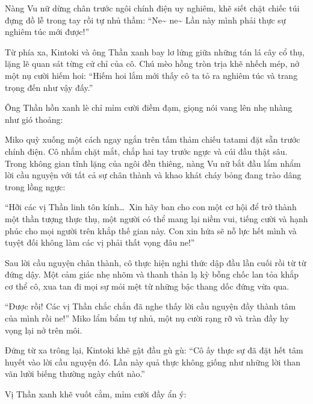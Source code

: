 \documentclass[../main.tex]{subfiles}
\begin{document}

Nàng Vu nữ dừng chân trước ngôi chính điện uy nghiêm, khẽ siết chặt chiếc túi đựng đồ lễ trong tay rồi tự nhủ thầm: ``Ne\~{} ne\~{} Lần này mình phải thực sự nghiêm túc mới được!''

Từ phía xa, Kintoki và ông Thần xanh bay lơ lửng giữa những tán lá cây cổ thụ, lặng lẽ quan sát từng cử chỉ của cô. Chú mèo hồng tròn trịa khẽ nhếch mép, nở một nụ cười hiếm hoi: ``Hiếm hoi lắm mới thấy cô ta tỏ ra nghiêm túc và trang trọng đến như vậy đấy.''

Ông Thần hồn xanh lè chỉ mỉm cười điềm đạm, giọng nói vang lên nhẹ nhàng như gió thoảng: 

Miko quỳ xuống một cách ngay ngắn trên tấm thảm chiếu tatami đặt sẵn trước chính điện. Cô nhắm chặt mắt, chắp hai tay trước ngực và cúi đầu thật sâu. Trong không gian tĩnh lặng của ngôi đền thiêng, nàng Vu nữ bắt đầu lẩm nhẩm lời cầu nguyện với tất cả sự chân thành và khao khát cháy bỏng đang trào dâng trong lồng ngực:

\begin{center}
  ``Hỡi các vị Thần linh tôn kính\dots\ Xin hãy ban cho con một cơ hội để trở thành một thần tượng thực thụ, một người có thể mang lại niềm vui, tiếng cười và hạnh phúc cho mọi người trên khắp thế gian này. Con xin hứa sẽ nỗ lực hết mình và tuyệt đối không làm các vị phải thất vọng đâu ne!''
\end{center}


Sau lời cầu nguyện chân thành, cô thực hiện nghi thức dập đầu lần cuối rồi từ từ đứng dậy. Một cảm giác nhẹ nhõm và thanh thản lạ kỳ bỗng chốc lan tỏa khắp cơ thể cô, xua tan đi mọi sự mỏi mệt từ những bậc thang dốc đứng vừa qua.

``Được rồi! Các vị Thần chắc chắn đã nghe thấy lời cầu nguyện đầy thành tâm của mình rồi ne!'' Miko lẩm bẩm tự nhủ, một nụ cười rạng rỡ và tràn đầy hy vọng lại nở trên môi.

Đứng từ xa trông lại, Kintoki khẽ gật đầu gù gù: ``Cô ấy thực sự đã đặt hết tâm huyết vào lời cầu nguyện đó. Lần này quả thực không giống như những lời than vãn lười biếng thường ngày chút nào.''

Vị Thần xanh khẽ vuốt cằm, mỉm cười đầy ẩn ý: 
\end{document}
